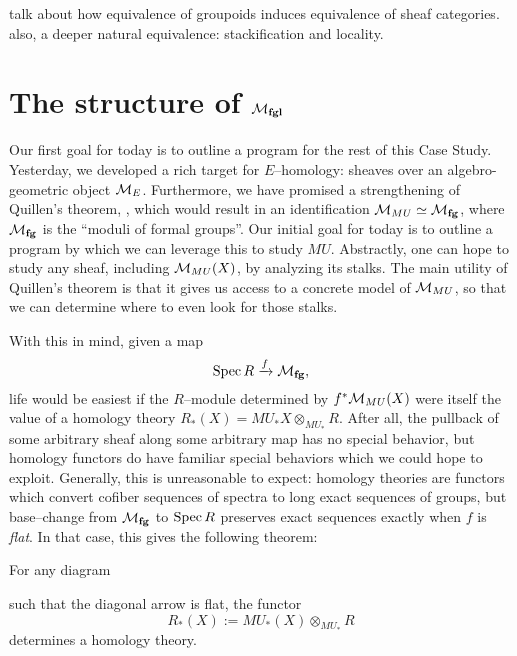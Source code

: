 talk about how equivalence of groupoids induces equivalence of sheaf categories.  also, a deeper natural equivalence: stackification and locality.







\section{The structure of $\mathcal{M}_{\mathbf{fgl}}$}\label{StructureOfMfgl}

Our first goal for today is to outline a program for the rest of this Case Study.  Yesterday, we developed a rich target for $E$--homology: sheaves over an algebro-geometric object $\mathcal{M}_{E}$.  Furthermore, we have promised a strengthening of Quillen's theorem, , which would result in an identification $\mathcal{M}_{MU} \simeq \mathcal{M}_{\mathbf{fg}}$, where $\mathcal{M}_{\mathbf{fg}}$ is the ``moduli of formal groups''.  Our initial goal for today is to outline a program by which we can leverage this to study $MU$.  Abstractly, one can hope to study any sheaf, including $\mathcal{M}_{MU}(X)$, by analyzing its stalks.  The main utility of Quillen's theorem is that it gives us access to a concrete model of $\mathcal{M}_{MU}$, so that we can determine where to even look for those stalks.

With this in mind, given a map \[\operatorname{Spec} R \xrightarrow{f} \mathcal{M}_{\mathbf{fg}},\] life would be easiest if the $R$--module determined by $f^* \mathcal{M}_{MU}(X)$ were itself the value of a homology theory $R_*(X) = MU_* X \otimes_{MU_*} R$.  After all, the pullback of some arbitrary sheaf along some arbitrary map has no special behavior, but homology functors do have familiar special behaviors which we could hope to exploit.  Generally, this is unreasonable to expect: homology theories are functors which convert cofiber sequences of spectra to long exact sequences of groups, but base--change from $\mathcal{M}_{\mathbf{fg}}$ to $\operatorname{Spec} R$ preserves exact sequences exactly when $f$ is \textit{flat}.  In that case, this gives the following theorem:

\begin{theorem}[Landweber]
For any diagram
\begin{center}
\end{center}
such that the diagonal arrow is flat, the functor \[R_*(X) := MU_*(X) \otimes_{MU_*} R\] determines a homology theory. 
\end{theorem}

